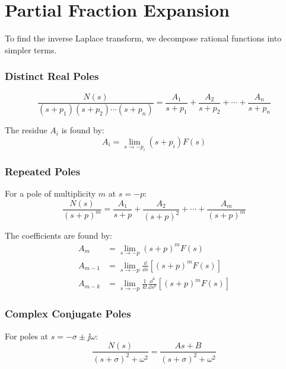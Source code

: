 \section{Partial Fraction Expansion}

To find the inverse Laplace transform, we decompose rational functions into simpler terms.

\subsubsection{Distinct Real Poles}
\begin{equation}
\frac{N(s)}{(s+p_1)(s+p_2)\cdots(s+p_n)} = \frac{A_1}{s+p_1} + \frac{A_2}{s+p_2} + \cdots + \frac{A_n}{s+p_n}
\end{equation}

The residue $A_i$ is found by:
\begin{equation}
A_i = \lim_{s \to -p_i} (s + p_i) F(s)
\end{equation}

\subsubsection{Repeated Poles}
For a pole of multiplicity $m$ at $s = -p$:
\begin{equation}
\frac{N(s)}{(s+p)^m} = \frac{A_1}{s+p} + \frac{A_2}{(s+p)^2} + \cdots + \frac{A_m}{(s+p)^m}
\end{equation}

The coefficients are found by:
\begin{align}
A_m &= \lim_{s \to -p} (s+p)^m F(s) \\
A_{m-1} &= \lim_{s \to -p} \frac{\dd}{\dd s}\left[(s+p)^m F(s)\right] \\
A_{m-k} &= \lim_{s \to -p} \frac{1}{k!}\frac{\dd^k}{\dd s^k}\left[(s+p)^m F(s)\right]
\end{align}

\subsubsection{Complex Conjugate Poles}
For poles at $s = -\sigma \pm \jj\omega$:
\begin{equation}
\frac{N(s)}{(s+\sigma)^2+\omega^2} = \frac{As + B}{(s+\sigma)^2+\omega^2}
\end{equation}

